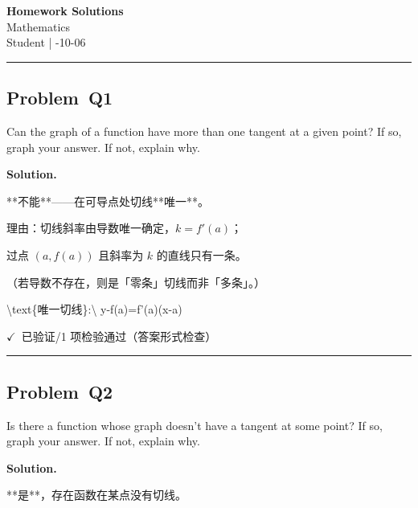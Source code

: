 \documentclass[12pt, a4paper]{article}
\newcommand{\problem}[1]{\subsection*{Problem~#1}}
\newcommand{\solution}{%
  \par\noindent
  {\color{solutiongreen}\bfseries Solution.}\par
}
\newcommand{\verifyok}{\textcolor{solutiongreen}{\ensuremath{\checkmark}\ 已验证}}
\begin{document}
\begin{center}
  {\LARGE\bfseries Homework Solutions} \\[0.6em]
  {\large\color{solutionblue} Mathematics} \\[0.4em]
  Student \quad | -10-06
\end{center}
\vspace{0.5em}\hrule\vspace{1.2em}
\problem{Q1}

\begin{stepbox}
Can the graph of a function have more than one tangent at a given point? If so, graph your answer. If not, explain why.
\end{stepbox}

\solution

\begin{stepbox}
**不能**——在可导点处切线**唯一**。
\end{stepbox}

\begin{stepbox}
理由：切线斜率由导数唯一确定，$k=f'(a)$；
\end{stepbox}

\begin{stepbox}
过点 $(a,f(a))$ 且斜率为 $k$ 的直线只有一条。
\end{stepbox}

\begin{stepbox}
（若导数不存在，则是「零条」切线而非「多条」。）
\end{stepbox}

\begin{center}
\textbackslash{}text\{唯一切线\}:\textbackslash{} y-f(a)=f'(a)(x-a)
\end{center}

\begin{verifybox}\small \verifyok{}/1 项检验通过（答案形式检查） \end{verifybox}

\vspace{0.8em}\hrule\vspace{0.8em}

\problem{Q2}

\begin{stepbox}
Is there a function whose graph doesn't have a tangent at some point? If so, graph your answer. If not, explain why.
\end{stepbox}

\solution

\begin{stepbox}
**是**，存在函数在某点没有切线。
\end{stepbox}
\end{document}
